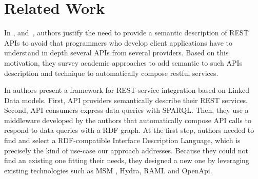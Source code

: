\section{Related Work}

\vspace*{-0.2cm}




In \cite{verborgh_rest_2014}, and~\cite{7195633}, authors justify the need to provide a semantic description of REST APIs to avoid that programmers who develop client applications have to understand in depth several APIs from several providers. Based on this motivation, they survey academic approaches to add semantic to such APIs description and technique to automatically compose restful services. %



In \cite{serrano2017linked} authors present a framework for REST-service integration based on Linked Data models. First, API providers semantically describe their REST services. Second, API consumers express data queries with SPARQL. Then, they use a middleware developed by the authors that automatically compose API calls to respond to data queries with a RDF graph.
At the first step, authors needed to find and select a RDF-compatible Interface Description Language, which is precisely the kind of use-case our approach addresses. Because they could not find an existing one fitting their needs, they designed a new one by leveraging existing technologies such as MSM \cite{pedrinaci2010toward}, Hydra, RAML and OpenApi. %


